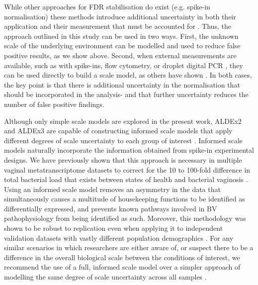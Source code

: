 \documentclass[10pt,letterpaper]{article}
\begin{document}
While other approaches for FDR stabilisation do exist (e.g. spike-in normalisation) these methods introduce additional uncertainty in both their application and their measurement that must be accounted for \cite{risso_normalization_2014}. Thus, the approach outlined in this study can be used in two ways. First, the unknown scale of the underlying environment can be modelled and used to reduce false positive results, as we show above. Second, when external measurements are available, such as with spike-ins, flow cytometry, or droplet digital PCR \cite{lin_towards_2019, barlow_quantitative_2020}, they can be used directly to build a scale model, as others have shown \cite{konnaris_uncertainty_2025}. In both cases, the key point is that there is additional uncertainty in the normalisation that should be incorporated in the analysis- and that further uncertainty reduces the number of false positive findings.

Although only simple scale models are explored in the present work, ALDEx2 and ALDEx3 are capable of constructing informed scale models that apply different degrees of scale uncertainty to each group of interest \cite{nixon_scale_2024, nixon_incorporating_2025}. Informed scale models naturally incorporate the information obtained from spike-in experimental designs. We have previously shown\cite{dos_santos_vaginal_2024, dos_santos_incorporating_2026} that this approach is necessary in multiple vaginal metatranscriptome datasets to correct for the 10 to 100-fold difference in total bacterial load that exists between states of health and bacterial vaginosis \cite{zozaya-hinchliffe_quantitative_2010}. Using an informed scale model removes an asymmetry in the data that simultaneously causes a multitude of housekeeping functions to be identified as differentially expressed, and prevents known pathways involved in BV pathophysiology from being identified as such. Moreover, this methodology was shown to be robust to replication even when applying it to independent validation datasets with vastly different population demographics \cite{dos_santos_vaginal_2024}. For any similar scenarios in which researchers are either aware of, or suspect there to be a difference in the overall biological scale between the conditions of interest, we recommend the use of a full, informed scale model over a simpler approach of modelling the same degree of scale uncertainty across all samples \cite{dos_santos_incorporating_2026}.
\end{document}
